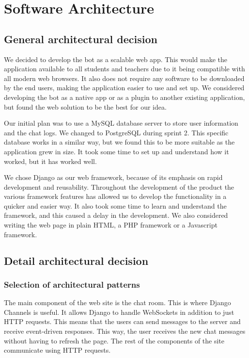 \section {Software Architecture}
\subsection{General architectural decision}
We decided to develop the bot as a scalable web app. This would make the application available to all students and teachers due to it being compatible with all modern web browsers. It also does not require any software to be downloaded by the end users, making the application easier to use and set up. We considered developing the bot as a native app or as a plugin to another existing application, but found the web solution to be the best for our idea.

Our initial plan was to use a MySQL database server to store user information and the chat logs. We changed to PostgreSQL during sprint 2. This specific database works in a similar way, but we found this to be more suitable as the application grew in size. It took some time to set up and understand how it worked, but it has worked well. 

We chose Django as our web framework, because of its emphasis on rapid development and reusability. Throughout the development of the product the various framework features has allowed us to develop the functionality in a quicker and easier way. It also took some time to learn and understand the framework, and this caused a delay in the development. We also considered writing the web page in plain HTML, a PHP framework or a Javascript framework. 

\subsection{Detail architectural decision}
\subsubsection{Selection of architectural patterns}
The main component of the web site is the chat room. This is where Django Channels is useful. It allows Django to handle WebSockets in addition to just HTTP requests. This means that the users can send messages to the server and receive event-driven responses. This way, the user receives the new chat messages without having to refresh the page. The rest of the components of the site communicate using HTTP requests. 


